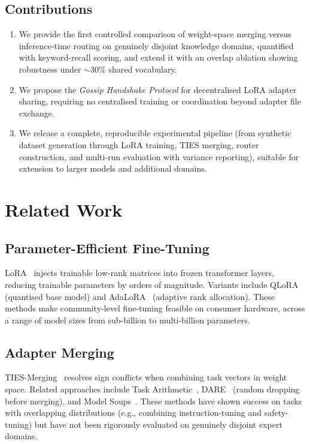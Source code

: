 \documentclass[conference, 10pt]{IEEEtran}
\begin{document}
\subsection{Contributions}
\begin{enumerate}
    \item We provide the first controlled comparison of weight-space merging
          versus inference-time routing on genuinely disjoint knowledge
          domains, quantified with keyword-recall scoring, and extend it
          with an overlap ablation showing robustness under $\sim$30\%
          shared vocabulary.
    \item We propose the \emph{Gossip Handshake Protocol} for decentralised
          LoRA adapter sharing, requiring no centralised training or
          coordination beyond adapter file exchange.
    \item We release a complete, reproducible experimental pipeline (from
          synthetic dataset generation through LoRA training, TIES merging,
          router construction, and multi-run evaluation with variance
          reporting), suitable for extension to larger models and additional
          domains.
\end{enumerate}

\section{Related Work}
\label{sec:related}

\subsection{Parameter-Efficient Fine-Tuning}
LoRA~\cite{hu2022lora} injects trainable low-rank matrices into frozen
transformer layers, reducing trainable parameters by orders of magnitude.
Variants include QLoRA~\cite{dettmers2023qlora} (quantised base model)
and AdaLoRA~\cite{zhang2023adalora} (adaptive rank allocation).
These methods make community-level fine-tuning feasible on consumer hardware,
across a range of model sizes from sub-billion to multi-billion parameters.

\subsection{Adapter Merging}
TIES-Merging~\cite{yadav2023ties} resolves sign conflicts when combining
task vectors in weight space. Related approaches include
Task Arithmetic~\cite{ilharco2023editing}, DARE~\cite{yu2024dare}
(random dropping before merging), and Model Soups~\cite{wortsman2022model}.
These methods have shown success on tasks with overlapping distributions
(e.g., combining instruction-tuning and safety-tuning) but have not been
rigorously evaluated on genuinely disjoint expert domains.
\end{document}
